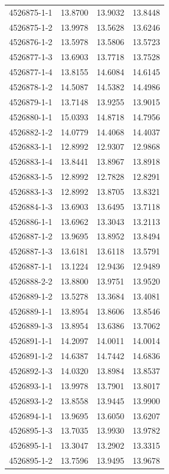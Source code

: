 \begin{longtable}{lrrr}
4526875-1-1 & 13.8700 & 13.9032 & 13.8448 \\
4526875-1-2 & 13.9978 & 13.5628 & 13.6246 \\
4526876-1-2 & 13.5978 & 13.5806 & 13.5723 \\
4526877-1-3 & 13.6903 & 13.7718 & 13.7528 \\
4526877-1-4 & 13.8155 & 14.6084 & 14.6145 \\
4526878-1-2 & 14.5087 & 14.5382 & 14.4986 \\
4526879-1-1 & 13.7148 & 13.9255 & 13.9015 \\
4526880-1-1 & 15.0393 & 14.8718 & 14.7956 \\
4526882-1-2 & 14.0779 & 14.4068 & 14.4037 \\
4526883-1-1 & 12.8992 & 12.9307 & 12.9868 \\
4526883-1-4 & 13.8441 & 13.8967 & 13.8918 \\
4526883-1-5 & 12.8992 & 12.7828 & 12.8291 \\
4526883-1-3 & 12.8992 & 13.8705 & 13.8321 \\
4526884-1-3 & 13.6903 & 13.6495 & 13.7118 \\
4526886-1-1 & 13.6962 & 13.3043 & 13.2113 \\
4526887-1-2 & 13.9695 & 13.8952 & 13.8494 \\
4526887-1-3 & 13.6181 & 13.6118 & 13.5791 \\
4526887-1-1 & 13.1224 & 12.9436 & 12.9489 \\
4526888-2-2 & 13.8800 & 13.9751 & 13.9520 \\
4526889-1-2 & 13.5278 & 13.3684 & 13.4081 \\
4526889-1-1 & 13.8954 & 13.8606 & 13.8546 \\
4526889-1-3 & 13.8954 & 13.6386 & 13.7062 \\
4526891-1-1 & 14.2097 & 14.0011 & 14.0014 \\
4526891-1-2 & 14.6387 & 14.7442 & 14.6836 \\
4526892-1-3 & 14.0320 & 13.8984 & 13.8537 \\
4526893-1-1 & 13.9978 & 13.7901 & 13.8017 \\
4526893-1-2 & 13.8558 & 13.9445 & 13.9900 \\
4526894-1-1 & 13.9695 & 13.6050 & 13.6207 \\
4526895-1-3 & 13.7035 & 13.9930 & 13.9782 \\
4526895-1-1 & 13.3047 & 13.2902 & 13.3315 \\
4526895-1-2 & 13.7596 & 13.9495 & 13.9678 \\

\end{longtable}
